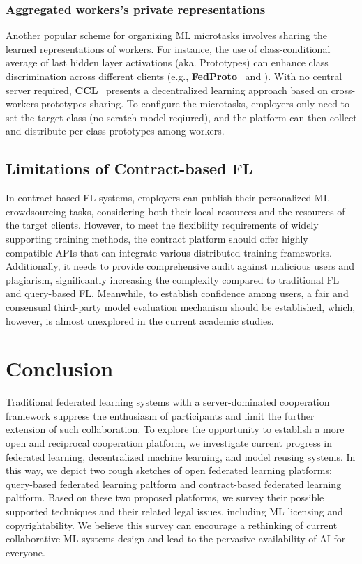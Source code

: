 \subsubsection{Aggregated workers's private representations}
Another popular scheme for organizing ML microtasks involves sharing the learned representations of workers. 
For instance, the use of class-conditional average of last hidden layer activations (aka. Prototypes) can enhance class discrimination across different clients (e.g., \textbf{FedProto}~\cite{michieli2021prototype, tan2022fedproto} and \cite{berdoz2022scalable}).
With no central server required, \textbf{CCL}~\cite{aketi2024cross} presents a decentralized learning approach based on cross-workers prototypes sharing.
To configure the microtasks, employers only need to set the target class (no scratch model reqiured), and the platform can then collect and distribute per-class prototypes among workers.

\subsection{Limitations of Contract-based FL}
\label{sec:limitations_cbfl}
In contract-based FL systems, employers can publish their personalized ML crowdsourcing tasks, considering both their local resources and the resources of the target clients. 
However, to meet the flexibility requirements of widely supporting training methods, the contract platform should offer highly compatible APIs that can integrate various distributed training frameworks. 
Additionally, it needs to provide comprehensive audit against malicious users and plagiarism, significantly increasing the complexity compared to traditional FL and query-based FL.
Meanwhile, to establish confidence among users, a fair and consensual third-party model evaluation mechanism should be established, which, however, is almost unexplored in the current academic studies.



\section{Conclusion}
\label{sec:conclusion}
Traditional federated learning systems with a server-dominated cooperation framework suppress the enthusiasm of participants and limit the further extension of such collaboration. 
To explore the opportunity to establish a more open and reciprocal cooperation platform, we investigate current progress in federated learning, decentralized machine learning, and model reusing systems. 
In this way, we depict two rough sketches of open federated learning platforms: query-based federated learning paltform and contract-based federated learning paltform. 
Based on these two proposed platforms, we survey their possible supported techniques and their related legal issues, including ML licensing and copyrightability. 
We believe this survey can encourage a rethinking of current collaborative ML systems design and lead to the pervasive availability of AI for everyone.



